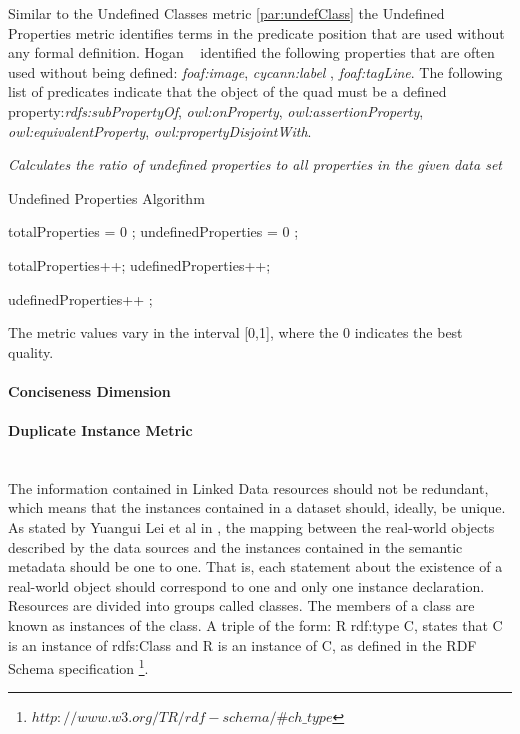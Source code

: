 {{Similar to the Undefined Classes metric \ref{par:undefClass} the Undefined Properties metric identifies terms in the predicate position that are used without any formal definition.
 Hogan  ~\cite{hogan2010} identified the following properties that are often used without being defined:  \textit{foaf:image}, \textit{cycann:label} , \textit{foaf:tagLine}.
The following list of predicates indicate that the object of the quad must be a defined property:\textit{rdfs:subPropertyOf}, \textit{owl:onProperty}, \textit{owl:assertionProperty}, \textit{owl:equivalentProperty}, \textit{owl:propertyDisjointWith}.

\begin{mdframed}[style=metricdefinition]
\emph{Calculates the ratio of undefined properties to all properties in the given data set}
\end{mdframed}

\begin{algorithm}
\caption{Undefined Properties Algorithm}
\begin{algorithmic}[1]
\State totalProperties = 0 ;
\State undefinedProperties = 0 ;
\EndProcedure

 totalProperties++; \EndIf 
{} udefinedProperties++; \EndIf

 udefinedProperties++ ; \EndIf
{}
\EndProcedure
\end{algorithmic}
\end{algorithm}

The metric values vary in the interval [0,1], where  the 0 indicates the best quality.


\paragraph{Conciseness Dimension}

\paragraph{Duplicate Instance Metric} ~\\
The information contained in Linked Data resources should not be redundant, which means that the instances contained in a dataset should, ideally, be unique. As stated by Yuangui Lei et al in \cite{Lei2007}, the mapping between the real-world objects described by the data sources and the instances contained in the semantic metadata should be one to one. That is, each statement about the existence of a real-world object should correspond to one and only one instance declaration.
Resources are divided into groups called classes. The members of a class are known as instances of the class. A triple of the form: R rdf:type C, states that C is an instance of rdfs:Class and R is an instance of C, as defined in the RDF Schema specification \footnote{$http://www.w3.org/TR/rdf-schema/\#ch\_type$}.

}}
